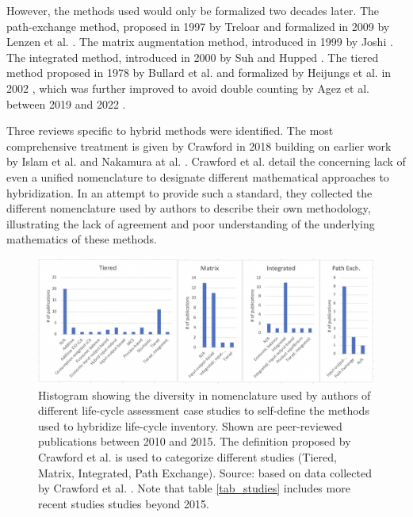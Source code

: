 \documentclass{article}
\begin{document}
        However, the methods used would only be formalized two decades later. The path-exchange method, proposed in 1997 by Treloar \cite{treloar_extracting_1997} and formalized in 2009 by Lenzen et al. \cite{lenzen_path_2009}. The matrix augmentation method, introduced in 1999 by Joshi \cite{joshi_product_1999}. The integrated method, introduced in 2000 by Suh and Hupped \cite{suh_gearing_2000}. The tiered method proposed in 1978 by Bullard et al. \cite{bullard_net_1978} and formalized by Heijungs et al. in 2002 \cite{heijungs_computational_2002}, which was further improved to avoid double counting by Agez et al. between 2019 and 2022 \cite{agez_lifting_2019}\cite{agez_hybridization_2020}\cite{agez_correcting_2022}.

        Three reviews specific to hybrid methods were identified. The most comprehensive treatment is given by Crawford in 2018 \cite{crawford_hybrid_2018} building on earlier work by Islam et al. \cite{islam_review_2016} and Nakamura at al. \cite{nakamura_inputoutput_2016}. Crawford et al. detail the concerning lack of even a unified nomenclature to designate different mathematical approaches to hybridization. In an attempt to provide such a standard, they collected the different nomenclature used by authors to describe their own methodology, illustrating the lack of agreement and poor understanding of the underlying mathematics of these methods. 
        
        \begin{figure}[h!]
        	\centering
        	\includegraphics[width=\textwidth]{figures/nomenclature.png}
        	\caption{Histogram showing the diversity in nomenclature used by authors of different life-cycle assessment case studies to self-define the methods used to hybridize life-cycle inventory. Shown are peer-reviewed publications between 2010 and 2015. The definition proposed by Crawford et al. is used to categorize different studies (Tiered, Matrix, Integrated, Path Exchange). Source: based on data collected by Crawford et al. \cite{crawford_hybrid_2018}. Note that table \ref{tab_studies} includes more recent studies studies beyond 2015.}
        	\label{fig:performance}
        \end{figure}
        
\end{document}

